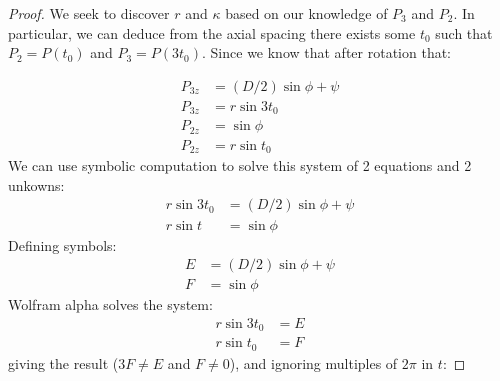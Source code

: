 \documentclass[11pt]{article}
\begin{document}
{\begin{proof}
We seek to discover $r$ and $\kappa$ based on our knowledge of $P_3$ and $P_2$.
In particular, we can deduce from the axial spacing there exists some $t_0$ such
that $P_2 = P(t_0)$ and $P_3 = P(3t_0)$.
Since we know that after rotation that:

  \begin{align*}
    P_{3z} &= (D/2) \sin{\phi + \psi} \\
    P_{3z} &= r\sin{3t_0} \\
    P_{2z} &= \sin{\phi} \\
    P_{2z} &= r\sin{t_0}
  \end{align*}
  We can use symbolic computation to solve this system of 2 equations and 2 unkowns:
  \begin{align*}
    r\sin{3t_0} &= (D/2) \sin{\phi + \psi} \\
    r\sin{t} &= \sin{\phi}
  \end{align*}
  Defining symbols:
  \begin{align*}
    E &= (D/2) \sin{\phi + \psi} \\
    F &= \sin{\phi}
  \end{align*}
  Wolfram alpha solves the system:
  \begin{align*}  
    r\sin{3t_0} &= E \\
    r\sin{t_0} &= F
  \end{align*}
  giving the result ($3F \neq E$ and $F \neq 0$), and ignoring multiples of $2\pi$ in $t$:


\end{proof}}
\end{document}
